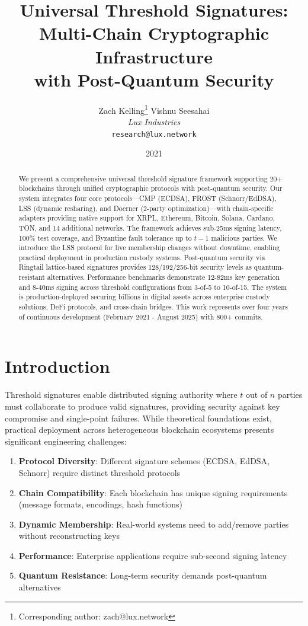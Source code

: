 \documentclass[11pt,twocolumn]{article}
\title{\textbf{Universal Threshold Signatures:\\Multi-Chain Cryptographic Infrastructure\\with Post-Quantum Security}}
\author{
Zach Kelling\thanks{Corresponding author: zach@lux.network}
\quad
Vishnu Seesahai\\
\textit{Lux Industries}\\
\texttt{research@lux.network}
}
\date{2021}
\begin{document}
\luxcoverpage
\maketitle

\begin{abstract}
We present a comprehensive universal threshold signature framework supporting 20+ blockchains through unified cryptographic protocols with post-quantum security. Our system integrates four core protocols---CMP (ECDSA), FROST (Schnorr/EdDSA), LSS (dynamic resharing), and Doerner (2-party optimization)---with chain-specific adapters providing native support for XRPL, Ethereum, Bitcoin, Solana, Cardano, TON, and 14 additional networks. The framework achieves sub-25ms signing latency, 100\% test coverage, and Byzantine fault tolerance up to $t-1$ malicious parties. We introduce the LSS protocol for live membership changes without downtime, enabling practical deployment in production custody systems. Post-quantum security via Ringtail lattice-based signatures provides 128/192/256-bit security levels as quantum-resistant alternatives. Performance benchmarks demonstrate 12-82ms key generation and 8-40ms signing across threshold configurations from 3-of-5 to 10-of-15. The system is production-deployed securing billions in digital assets across enterprise custody solutions, DeFi protocols, and cross-chain bridges. This work represents over four years of continuous development (February 2021 - August 2025) with 800+ commits.
\end{abstract}

\section{Introduction}

Threshold signatures enable distributed signing authority where $t$ out of $n$ parties must collaborate to produce valid signatures, providing security against key compromise and single-point failures. While theoretical foundations exist, practical deployment across heterogeneous blockchain ecosystems presents significant engineering challenges:

\begin{enumerate}
\item \textbf{Protocol Diversity}: Different signature schemes (ECDSA, EdDSA, Schnorr) require distinct threshold protocols
\item \textbf{Chain Compatibility}: Each blockchain has unique signing requirements (message formats, encodings, hash functions)
\item \textbf{Dynamic Membership}: Real-world systems need to add/remove parties without reconstructing keys
\item \textbf{Performance}: Enterprise applications require sub-second signing latency
\item \textbf{Quantum Resistance}: Long-term security demands post-quantum alternatives
\end{enumerate}
\end{document}
